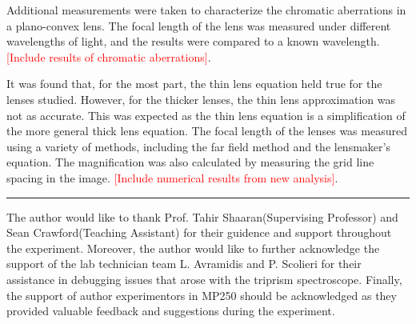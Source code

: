 \documentclass[aip, cp, amsmath, amssymb, reprint, nofootinbib]{revtex4-2}
\newcommand\advname{Tahir Shaaran\space} %
\newcommand\taname{Sean Crawford\space} %
\begin{document}
        Additional measurements were taken to characterize the chromatic aberrations in a plano-convex lens. The focal length of the lens was measured under different wavelengths of light, and the results were compared to a known wavelength. \textcolor{red}{[Include results of chromatic aberrations]}.


        It was found that, for the most part, the thin lens equation held true for the lenses studied. However, for the thicker lenses, the thin lens approximation was not as accurate. This was expected as the thin lens equation is a simplification of the more general thick lens equation. The focal length of the lenses was measured using a variety of methods, including the far field method and the lensmaker's equation. The magnification was also calculated by measuring the grid line spacing in the image. \textcolor{red}{[Include numerical results from new analysis]}.


\onecolumngrid
\begin{center}
    \vspace{0.8cm}
    \noindent\rule{0.9\textwidth}{0.5pt}
\end{center}

\begin{acknowledgments}
    The author would like to thank Prof. \advname (Supervising Professor) and \taname (Teaching Assistant) for their guidence and support throughout the experiment. Moreover, the author would like to further acknowledge the support of the lab technician team L. Avramidis and P. Scolieri for their assistance in debugging issues that arose with the triprism spectroscope. Finally, the support of author experimentors in MP250 should be acknowledged as they provided valuable feedback and suggestions during the experiment.
\end{acknowledgments}





\end{document}
